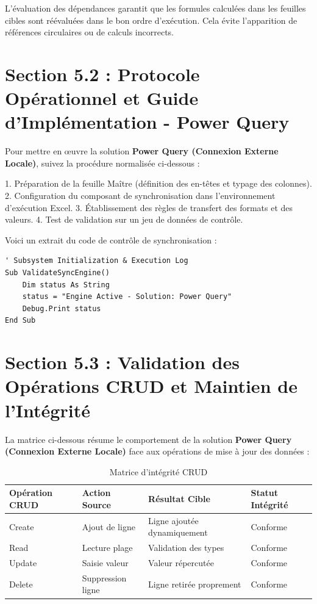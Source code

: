 \documentclass[12pt,a4paper]{report}
\begin{document}
L'évaluation des dépendances garantit que les formules calculées dans les feuilles cibles sont réévaluées dans le bon ordre d'exécution. Cela évite l'apparition de références circulaires ou de calculs incorrects.


\section{Section 5.2 : Protocole Opérationnel et Guide d'Implémentation - Power Query}
Pour mettre en œuvre la solution \textbf{Power Query (Connexion Externe Locale)}, suivez la procédure normalisée ci-dessous :

1. Préparation de la feuille Maître (définition des en-têtes et typage des colonnes).
2. Configuration du composant de synchronisation dans l'environnement d'exécution Excel.
3. Établissement des règles de transfert des formats et des valeurs.
4. Test de validation sur un jeu de données de contrôle.

Voici un extrait du code de contrôle de synchronisation :
\begin{lstlisting}[caption=Code de controle operationnel]
' Subsystem Initialization & Execution Log
Sub ValidateSyncEngine()
    Dim status As String
    status = "Engine Active - Solution: Power Query"
    Debug.Print status
End Sub
\end{lstlisting}


\section{Section 5.3 : Validation des Opérations CRUD et Maintien de l'Intégrité}
La matrice ci-dessous résume le comportement de la solution \textbf{Power Query (Connexion Externe Locale)} face aux opérations de mise à jour des données :

\begin{table}[h]
\centering
\begin{tabular}{@{}llll@{}}
\toprule
\textbf{Opération CRUD} & \textbf{Action Source} & \textbf{Résultat Cible} & \textbf{Statut Intégrité} \\ \midrule
Create & Ajout de ligne & Ligne ajoutée dynamiquement & Conforme \\
Read & Lecture plage & Validation des types & Conforme \\
Update & Saisie valeur & Valeur répercutée & Conforme \\
Delete & Suppression ligne & Ligne retirée proprement & Conforme \\ \bottomrule
\end{tabular}
\caption{Matrice d'intégrité CRUD}
\end{table}
\end{document}
